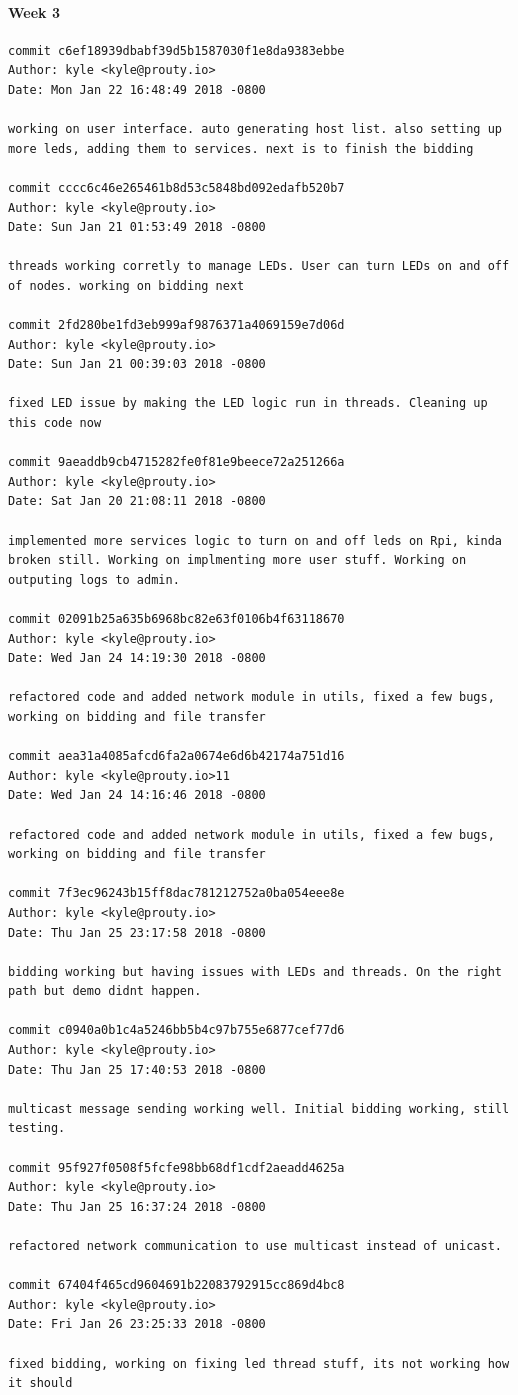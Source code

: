 \documentclass[draftclsnofoot, onecolumn, compsoc, 10pt]{IEEEtran}
\begin{document}
\paragraph{Week 3}
\begin{lstlisting}
commit c6ef18939dbabf39d5b1587030f1e8da9383ebbe 
Author: kyle <kyle@prouty.io> 
Date: Mon Jan 22 16:48:49 2018 -0800 

working on user interface. auto generating host list. also setting up more leds, adding them to services. next is to finish the bidding 

commit cccc6c46e265461b8d53c5848bd092edafb520b7 
Author: kyle <kyle@prouty.io> 
Date: Sun Jan 21 01:53:49 2018 -0800 

threads working corretly to manage LEDs. User can turn LEDs on and off of nodes. working on bidding next 

commit 2fd280be1fd3eb999af9876371a4069159e7d06d 
Author: kyle <kyle@prouty.io> 
Date: Sun Jan 21 00:39:03 2018 -0800 

fixed LED issue by making the LED logic run in threads. Cleaning up this code now 

commit 9aeaddb9cb4715282fe0f81e9beece72a251266a 
Author: kyle <kyle@prouty.io> 
Date: Sat Jan 20 21:08:11 2018 -0800 

implemented more services logic to turn on and off leds on Rpi, kinda broken still. Working on implmenting more user stuff. Working on outputing logs to admin. 

commit 02091b25a635b6968bc82e63f0106b4f63118670 
Author: kyle <kyle@prouty.io> 
Date: Wed Jan 24 14:19:30 2018 -0800 

refactored code and added network module in utils, fixed a few bugs, working on bidding and file transfer 

commit aea31a4085afcd6fa2a0674e6d6b42174a751d16 
Author: kyle <kyle@prouty.io>11 
Date: Wed Jan 24 14:16:46 2018 -0800 

refactored code and added network module in utils, fixed a few bugs, working on bidding and file transfer 

commit 7f3ec96243b15ff8dac781212752a0ba054eee8e 
Author: kyle <kyle@prouty.io> 
Date: Thu Jan 25 23:17:58 2018 -0800 

bidding working but having issues with LEDs and threads. On the right path but demo didnt happen. 

commit c0940a0b1c4a5246bb5b4c97b755e6877cef77d6 
Author: kyle <kyle@prouty.io> 
Date: Thu Jan 25 17:40:53 2018 -0800 

multicast message sending working well. Initial bidding working, still testing. 

commit 95f927f0508f5fcfe98bb68df1cdf2aeadd4625a 
Author: kyle <kyle@prouty.io> 
Date: Thu Jan 25 16:37:24 2018 -0800 

refactored network communication to use multicast instead of unicast. 

commit 67404f465cd9604691b22083792915cc869d4bc8 
Author: kyle <kyle@prouty.io> 
Date: Fri Jan 26 23:25:33 2018 -0800 

fixed bidding, working on fixing led thread stuff, its not working how it should 
\end{lstlisting}
\end{document}

